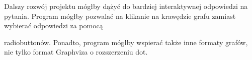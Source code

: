 Dalszy rozwój projektu mógłby dążyć do bardziej interaktywnej odpowiedzi na pytania. Program mógłby pozwalać na klikanie na krawędzie grafu 
zamiast wybierać odpowiedzi za pomocą 


radiobuttonów. Ponadto, program mógłby wspierać także inne formaty grafów, nie tylko format Graphviza o rozszerzeniu dot. 
